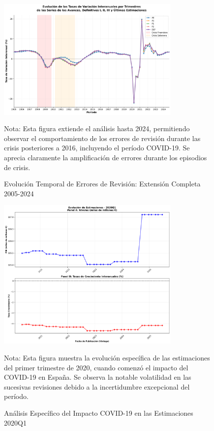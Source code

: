 \documentclass[12pt,a4paper]{article}
\begin{document}
\begin{figure}[h]
\centering
\includegraphics[width=0.8\textwidth]{../figuras/figura_2_pavia_robusta_2005_2024.png}
\caption{Evolución Temporal de Errores de Revisión: Extensión Completa 2005-2024}
\label{fig:evolucion_completa}
\begin{flushleft}
\footnotesize
Nota: Esta figura extiende el análisis hasta 2024, permitiendo observar el comportamiento de los errores de revisión durante las crisis posteriores a 2016, incluyendo el período COVID-19. Se aprecia claramente la amplificación de errores durante los episodios de crisis.
\end{flushleft}
\end{figure}

\begin{figure}[h]
\centering
\includegraphics[width=0.8\textwidth]{../figuras/evolucion_estimaciones_2020Q1_robusto.png}
\caption{Análisis Específico del Impacto COVID-19 en las Estimaciones 2020Q1}
\label{fig:covid_impact}
\begin{flushleft}
\footnotesize
Nota: Esta figura muestra la evolución específica de las estimaciones del primer trimestre de 2020, cuando comenzó el impacto del COVID-19 en España. Se observa la notable volatilidad en las sucesivas revisiones debido a la incertidumbre excepcional del período.
\end{flushleft}
\end{figure}
\end{document}
